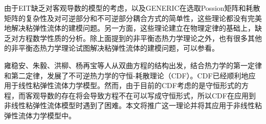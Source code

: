 \documentclass{article}
\begin{document}
由于EIT缺乏对客观导数的模型的考虑，以及GENERIC在选取Possion矩阵和耗散矩阵的复杂性及对可逆部分和不可逆部分耦合方式的简单性，这些理论都没有完美地解决粘弹性流体的建模问题。另一方面，这些理论建立在物理定律的基础上，缺乏对方程数学性质的分析。除上面提到的非平衡态热力学理论之外，也有很多其他的非平衡态热力学理论试图解决粘弹性流体的建模问题，可以参看\cite{stratonovich2012nonlinear,huo1993nonequilibrium,eu1992kinetic}。

雍稳安、朱毅、洪柳、杨再宝等人从双曲方程的结构出发，结合热力学的第一定律和第二定律，发展了不可逆热力学的守恒-耗散理论（CDF）\cite{zhu2014conservation}。CDF已经顺利地应用于线性粘弹性流体力学模型。然而，由于目前的CDF考虑的是守恒形式的方程，而客观导数的存在将会导致方程不在可以写成守恒形式，所以CDF在应用到非线性粘弹性流体模型时遇到了困难。本文将推广这一理论并将其应用于非线性粘弹性流体力学模型中。
\end{document}
